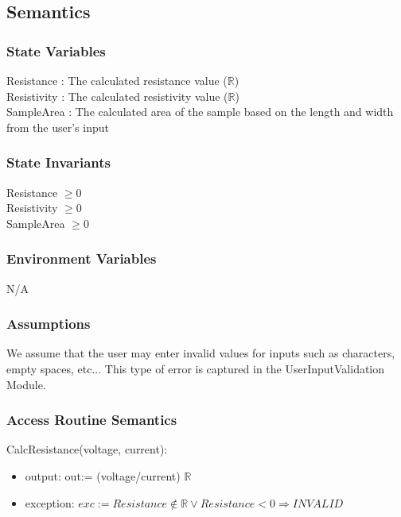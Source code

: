 \documentclass[12pt, titlepage]{article}
\begin{document}
\subsection{Semantics}

\subsubsection{State Variables}

Resistance : The calculated resistance value ($\mathbb{R}$)\\
Resistivity : The calculated resistivity value ($\mathbb{R}$) \\
SampleArea : The calculated area of the sample based on the length and width from the user's input

\subsubsection{State Invariants}

Resistance $\geq 0$ \\
Resistivity $\geq 0$ \\
SampleArea $\geq 0$

\subsubsection{Environment Variables}

N/A

\subsubsection{Assumptions}

We assume that the user may enter invalid values for inputs such as characters, empty spaces, etc...
This type of error is captured in the UserInputValidation Module.

\subsubsection{Access Routine Semantics}

\noindent CalcResistance(voltage, current):
\begin{itemize}
\item output: out:= (voltage/current) $\mathbb{R}$
\item exception: $exc:= Resistance \notin \mathbb{R} \lor Resistance < 0  \Rightarrow INVALID$
\end{itemize}
\end{document}
